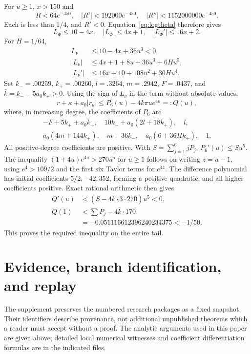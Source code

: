 For \(u\geq1\), \(x>150\) and
\[
 R<64e^{-450},\quad |R'|<192000e^{-450},\quad
 |R''|<1152000000e^{-450}.
\]
Each is less than \(1/4\), and \(R'<0\). Equation~\eqref{eq:logtheta}
therefore gives
\[
 L_\Phi\leq10-4x,\quad |L_\Phi|\leq4x+1,\quad
 |L_\Phi'|\leq16x+2.
\]
For \(H=1/64\),
\begin{align*}
 L_\nu&\leq10-4x+36u^3<0,\\
 |L_\nu|&\leq4x+1+8u+36u^3+6Hu^5,\\
 |L_\nu'|&\leq16x+10+108u^2+30Hu^4 .
\end{align*}
Set \(k_-=.00259\), \(k_+=.00260\), \(l=.3264\),
\(m=.2942\), \(F=.0437\), and \(\bar k=k_--5a_0k_+>0\).
Using the sign of \(L_\nu\) in the term without absolute values,
\[
 r+\kappa+a_0|r_u|\leq P_6(u)-4\bar k\pi u e^{4u}=:Q(u),
\]
where, in increasing degree, the coefficients of \(P_6\) are
\[
 \begin{gathered}
 -F+5k_++a_0k_+,\quad 10k_-+a_0(2l+18k_+),\quad l,\\
 a_0(4m+144k_+),\quad m+36k_-,\quad
 a_0(6+36Hk_+),\quad1 .
 \end{gathered}
\]
All positive-degree coefficients are positive.
With \(S=\sum_{j=1}^6jP_j\), \(P_6'(u)\leq Su^5\).
The inequality \((1+4u)e^{4u}>270u^5\) for \(u\geq1\)
follows on writing \(z=u-1\), using \(e^4>109/2\) and the first six
Taylor terms for \(e^{4z}\). The difference polynomial has initial
coefficients \(5/2,-42,352\), forming a positive quadratic, and all
higher coefficients positive. Exact rational arithmetic then gives
\begin{align*}
 Q'(u)&<(S-4\bar k\cdot3\cdot270)u^5<0,\\
 Q(1)&<\sum P_j-4\bar k\cdot170\\
     &=-0.051116612396240234375<-1/50 .
\end{align*}
This proves the required inequality on the entire tail.

\section{Evidence, branch identification, and replay}\label{app:evidence}
The supplement preserves the numbered research packages as a fixed snapshot.
Their identifiers describe provenance, not additional unpublished theorems
which a reader must accept without a proof. The analytic arguments used
in this paper are given above; detailed local numerical witnesses and
coefficient differentiation formulas are in the indicated files.

